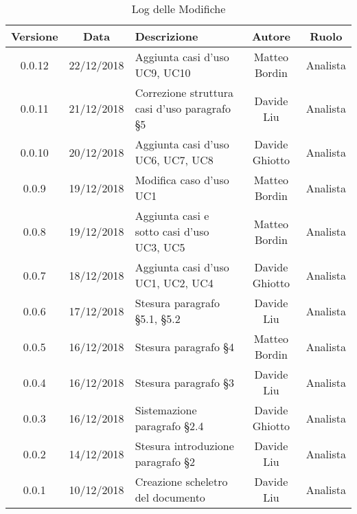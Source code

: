 \begin{table}[h!] %
            \centering
            \renewcommand{\arraystretch}{2}
            \begin{tabular}{|c|c|p{5cm}|c|c|} %
                \rowcolor{orange!50} %
        		\hline
        		\textbf{Versione} & \textbf{Data} & \textbf{Descrizione} & \textbf{Autore} & \textbf{Ruolo} \\
                \hline
                0.0.12 & 22/12/2018 & Aggiunta casi d’uso UC9, UC10 & Matteo Bordin & Analista \\
                \hline
                0.0.11 & 21/12/2018 & Correzione struttura casi d’uso paragrafo §5 & Davide Liu & Analista \\
                \hline
                0.0.10 & 20/12/2018 & Aggiunta casi d’uso UC6, UC7, UC8 & Davide Ghiotto & Analista \\
                \hline
                0.0.9 & 19/12/2018 & Modifica caso d’uso UC1 & Matteo Bordin & Analista \\
                \hline
                0.0.8 & 19/12/2018 & Aggiunta casi e sotto casi d’uso UC3, UC5 & Matteo Bordin & Analista \\
                \hline
                0.0.7 & 18/12/2018 & Aggiunta casi d’uso UC1, UC2, UC4 & Davide Ghiotto & Analista \\
                \hline
                0.0.6 & 17/12/2018 & Stesura paragrafo §5.1, §5.2 & Davide Liu & Analista \\
                \hline
                0.0.5 & 16/12/2018 & Stesura paragrafo §4 & Matteo Bordin & Analista \\
                \hline
                0.0.4 & 16/12/2018 & Stesura paragrafo §3 & Davide Liu & Analista \\
                \hline
                0.0.3 & 16/12/2018 & Sistemazione  paragrafo §2.4 & Davide Ghiotto & Analista \\
                \hline 
                0.0.2 & 14/12/2018 & Stesura introduzione paragrafo §2 & Davide Liu & Analista \\
                \hline
                0.0.1 & 10/12/2018 & Creazione scheletro del documento & Davide Liu & Analista \\
                \hline
                
                
                
                
        \end{tabular}
        \caption{Log delle Modifiche} %
        \label{tab:Log delle modifiche2}
\end{table}
